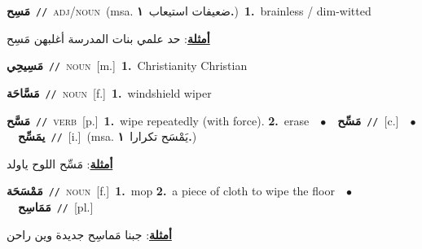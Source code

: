 \documentclass[10pt,a4paper,twoside]{article} %
\begin{document}
\begin{multicols}{2}
{\setlength\topsep{0pt}\textbf{\foreignlanguage{arabic}{مَسِح}}\ {\color{gray}\texttt{//}\color{black}}\ \textsc{adj/noun}\ \color{gray}(msa. \foreignlanguage{arabic}{ضعيفات استيعاب}~\foreignlanguage{arabic}{\textbf{١.}})\color{black}\ \textbf{1.}~brainless / dim-witted\  \begin{flushright}\color{gray}\foreignlanguage{arabic}{\textbf{\underline{\foreignlanguage{arabic}{أمثلة}}}: حد علمي بنات المدرسة أغلبهن مَسِح}\end{flushright}\color{black}} \vspace{2mm}

{\setlength\topsep{0pt}\textbf{\foreignlanguage{arabic}{مَسِيحِي}}\ {\color{gray}\texttt{//}\color{black}}\ \textsc{noun}\ [m.]\ \textbf{1.}~Christianity Christian\ } \vspace{2mm}

{\setlength\topsep{0pt}\textbf{\foreignlanguage{arabic}{مَسَّاحَة}}\ {\color{gray}\texttt{//}\color{black}}\ \textsc{noun}\ [f.]\ \textbf{1.}~windshield wiper\ } \vspace{2mm}

{\setlength\topsep{0pt}\textbf{\foreignlanguage{arabic}{مَسَّح}}\ {\color{gray}\texttt{//}\color{black}}\ \textsc{verb}\ [p.]\ \textbf{1.}~wipe repeatedly (with force).  \textbf{2.}~erase\ \ $\bullet$\ \ \setlength\topsep{0pt}\textbf{\foreignlanguage{arabic}{مَسِّح}}\ {\color{gray}\texttt{//}\color{black}}\ [c.]\ \ $\bullet$\ \ \setlength\topsep{0pt}\textbf{\foreignlanguage{arabic}{يمَسِّح}}\ {\color{gray}\texttt{//}\color{black}}\ [i.]\ \color{gray}(msa. \foreignlanguage{arabic}{يَمْسَح تكرارا}~\foreignlanguage{arabic}{\textbf{١.}})\color{black}\  \begin{flushright}\color{gray}\foreignlanguage{arabic}{\textbf{\underline{\foreignlanguage{arabic}{أمثلة}}}: مَسِّح اللوح ياولد}\end{flushright}\color{black}} \vspace{2mm}

{\setlength\topsep{0pt}\textbf{\foreignlanguage{arabic}{مَمْسَحَة}}\ {\color{gray}\texttt{//}\color{black}}\ \textsc{noun}\ [f.]\ \textbf{1.}~mop  \textbf{2.}~a piece of cloth to wipe the floor\ \ $\bullet$\ \ \setlength\topsep{0pt}\textbf{\foreignlanguage{arabic}{مَمَاسِح}}\ {\color{gray}\texttt{//}\color{black}}\ [pl.]\  \begin{flushright}\color{gray}\foreignlanguage{arabic}{\textbf{\underline{\foreignlanguage{arabic}{أمثلة}}}: جبنا مَماسِح جديدة وين راحن}\end{flushright}\color{black}} \vspace{2mm}


\end{multicols}
\end{document}
